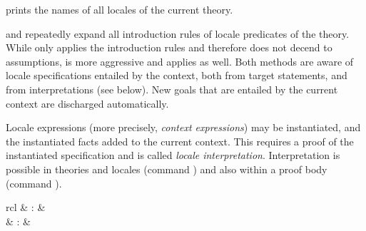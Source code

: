 \begin{isabellebody}
\begin{isamarkuptext}
\begin{description}
  \item \hyperlink{command.print-locales}{\mbox{}} prints the names of all locales
  of the current theory.

  \item \hyperlink{method.intro-locales}{\mbox{}} and \hyperlink{method.unfold-locales}{\mbox{}}
  repeatedly expand all introduction rules of locale predicates of the
  theory.  While \hyperlink{method.intro-locales}{\mbox{}} only applies the  introduction rules and therefore does not decend to
  assumptions, \hyperlink{method.unfold-locales}{\mbox{}} is more aggressive and applies
   as well.  Both methods are aware of locale
  specifications entailed by the context, both from target statements,
  and from interpretations (see below).  New goals that are entailed
  by the current context are discharged automatically.

  \end{description}%
\end{isamarkuptext}%
\isamarkuptrue%
%
\isamarkuptrue%
%
\begin{isamarkuptext}%
Locale expressions (more precisely, \emph{context expressions}) may
  be instantiated, and the instantiated facts added to the current
  context.  This requires a proof of the instantiated specification
  and is called \emph{locale interpretation}.  Interpretation is
  possible in theories and locales (command \hyperlink{command.interpretation}{\mbox{}}) and also within a proof body (command \hyperlink{command.interpret}{\mbox{}}).

  \begin{matharray}{rcl}
    \hypertarget{command.interpretation}{\hyperlink{command.interpretation}{\mbox{}}} & : &  \\
    \hypertarget{command.interpret}{\hyperlink{command.interpret}{\mbox{}}} & : &  \\
  \end{matharray}


\end{isamarkuptext}
\end{isabellebody}
